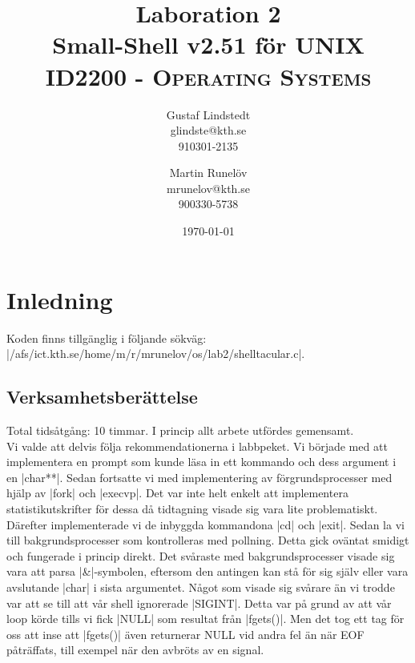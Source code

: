\documentclass[paper=a4, fontsize=11pt]{scrartcl} %
\title{ 
\huge Laboration 2 \\ Small-Shell v2.51 för UNIX \\ %
\vspace{10pt}
\normalfont \normalsize 
\textsc{ID2200 - Operating Systems } \\ [25pt] %
}
\author{Gustaf Lindstedt \\ glindste@kth.se \\ 910301-2135 \and Martin Runelöv \\ mrunelov@kth.se \\ 900330-5738}
\date{\vspace{8pt}\normalsize\today} %
\numberwithin{equation}{section} %
\numberwithin{figure}{section} %
\numberwithin{table}{section} %
\begin{document}
\maketitle

\section{Inledning}

Koden finns tillgänglig i följande sökväg:\\
|/afs/ict.kth.se/home/m/r/mrunelov/os/lab2/shelltacular.c|.\\



\subsection{Verksamhetsberättelse}
Total tidsåtgång: 10 timmar. I princip allt arbete utfördes gemensamt.\\

Vi valde att delvis följa rekommendationerna i labbpeket.
Vi började med att implementera en prompt som kunde läsa in ett kommando och dess argument i en |char**|.
Sedan fortsatte vi med implementering av förgrundsprocesser med hjälp av |fork| och |execvp|.
Det var inte helt enkelt att implementera statistikutskrifter för dessa då tidtagning visade sig vara lite problematiskt.
Därefter implementerade vi de inbyggda kommandona |cd| och |exit|.
Sedan la vi till bakgrundsprocesser som kontrolleras med pollning.
Detta gick oväntat smidigt och fungerade i princip direkt.
Det svåraste med bakgrundsprocesser visade sig vara att parsa |&|-symbolen,
eftersom den antingen kan stå för sig själv eller vara avslutande |char| i sista argumentet.
Något som visade sig svårare än vi trodde var att se till att vår shell ignorerade |SIGINT|.
Detta var på grund av att vår loop körde tills vi fick |NULL| som resultat från |fgets()|.
Men det tog ett tag för oss att inse att |fgets()| även returnerar NULL vid andra fel än när EOF påträffats, till exempel när den avbröts av en signal.
\end{document}
